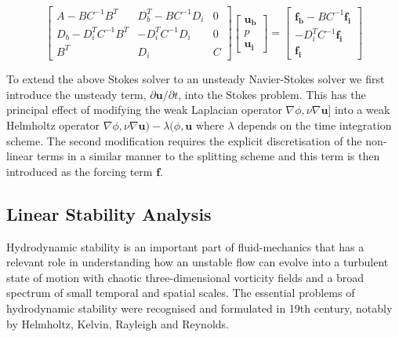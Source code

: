 \begin{equation}
\left[ \begin{array}{ccc}
 A-BC^{-1}B^T & D_b^T-BC^{-1}D_i & 0\\
 D_b-D_i^TC^{-1}B^T & -D_i^TC^{-1}D_i & 0\\
 B^T & D_i & C
 \end{array}\right]
 \left[ \begin{array}{c}
 \boldsymbol{u_b}\\
 p\\
 \boldsymbol{u_i}
 \end{array}\right] =
 \left[ \begin{array}{c}
 \boldsymbol{f_b} - BC^{-1}\boldsymbol{f_i}\\
 -D_i^TC^{-1}\boldsymbol{f_i}\\
 \boldsymbol{f_i}
 \end{array}\right]
 \end{equation}

 To extend the above Stokes solver to an unsteady Navier-Stokes solver we first introduce the unsteady term, $\partial \boldsymbol{u}/\partial t$, into the Stokes problem.
This has the principal effect of modifying the weak Laplacian operator $\nabla\phi,\nu\nabla\boldsymbol{u}$] into a weak Helmholtz operator
$\nabla\phi,\nu\nabla\boldsymbol{u})-\lambda(\phi,\boldsymbol{u}$ where $\lambda$ depends on the time integration scheme. The second modification requires the explicit discretisation of the non-linear terms in a similar manner to the splitting scheme and this term is then introduced as the forcing term $\boldsymbol{f}$.

\subsection{Linear Stability Analysis}

Hydrodynamic stability is an important part of fluid-mechanics that has a relevant role in understanding how an unstable flow can evolve into a turbulent state of motion with chaotic three-dimensional vorticity fields and a broad spectrum of small temporal and spatial scales. The essential problems of hydrodynamic stability were recognised and formulated in 19th century, notably by Helmholtz, Kelvin, Rayleigh and Reynolds.

